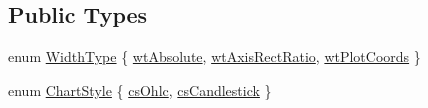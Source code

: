\subsection*{Public Types}
\begin{DoxyCompactItemize}
\item 
enum \hyperlink{classQCPFinancial_aef1761dda71a53dc5269685e9e492626}{Width\+Type} \{ \hyperlink{classQCPFinancial_aef1761dda71a53dc5269685e9e492626a0758d53bb6d7b4858e6bf8771edc934a}{wt\+Absolute}, 
\hyperlink{classQCPFinancial_aef1761dda71a53dc5269685e9e492626a806518350ea5814d28c29b0056e33ecd}{wt\+Axis\+Rect\+Ratio}, 
\hyperlink{classQCPFinancial_aef1761dda71a53dc5269685e9e492626af676bc8dbe700b96b333329c9dbfc30f}{wt\+Plot\+Coords}
 \}
\item 
enum \hyperlink{classQCPFinancial_a0f800e21ee98d646dfc6f8f89d10ebfb}{Chart\+Style} \{ \hyperlink{classQCPFinancial_a0f800e21ee98d646dfc6f8f89d10ebfba3a516016c9298d3e95dd82aa203c4390}{cs\+Ohlc}, 
\hyperlink{classQCPFinancial_a0f800e21ee98d646dfc6f8f89d10ebfbac803cbd39f26e3f206bcc7028679e62f}{cs\+Candlestick}
 \}
\end{DoxyCompactItemize}
